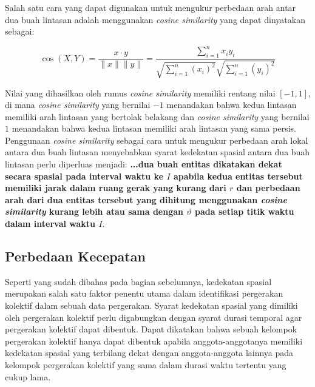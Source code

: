 Salah satu cara yang dapat digunakan untuk mengukur perbedaan arah antar dua buah lintasan adalah menggunakan \textit{cosine similarity} yang dapat dinyatakan sebagai:

\begin{equation}
    \cos (X, Y)= \frac{x \cdot y}{\|x\| \|y\|} = \frac{ \sum_{i=1}^{n}{x_i y_i}}{ \sqrt{\sum_{i=1}^{n}{(x_i)^2}} \sqrt{\sum_{i=1}^{n}{( y_i)^2}} }
    \label{bab3:cosine-similarity}
\end{equation}

Nilai yang dihasilkan oleh rumus \textit{cosine similarity} memiliki rentang nilai $[-1, 1]$, di mana \textit{cosine similarity} yang bernilai $-1$ menandakan bahwa kedua lintasan memiliki arah lintasan yang bertolak belakang dan \textit{cosine similarity} yang bernilai $1$ menandakan bahwa kedua lintasan memiliki arah lintasan yang sama persis. Penggunaan \textit{cosine similarity} sebagai cara untuk mengukur perbedaan arah lokal antara dua buah lintasan menyebabkan syarat kedekatan spasial antara dua buah lintasan perlu diperluas menjadi: \textbf{...dua buah entitas dikatakan dekat secara spasial pada interval waktu ke $I$ apabila kedua entitas tersebut memiliki jarak dalam ruang gerak yang kurang dari $r$ dan perbedaan arah dari dua entitas tersebut yang dihitung menggunakan \textit{cosine similarity} kurang lebih atau sama dengan $\vartheta$ pada setiap titik waktu dalam interval waktu $I$}.
    
\subsection{Perbedaan Kecepatan}
\label{subsec:beda-kecepatan}

Seperti yang sudah dibahas pada bagian sebelumnya, kedekatan spasial merupakan salah satu faktor penentu utama dalam identifikasi pergerakan kolektif dalam sebuah data pergerakan. Syarat kedekatan spasial yang dimiliki oleh pergerakan kolektif perlu digabungkan dengan syarat durasi temporal agar pergerakan kolektif dapat dibentuk. Dapat dikatakan bahwa sebuah kelompok pergerakan kolektif hanya dapat dibentuk apabila anggota-anggotanya memiliki kedekatan spasial yang terbilang dekat dengan anggota-anggota lainnya pada kelompok pergerakan kolektif yang sama dalam durasi waktu tertentu yang cukup lama.

